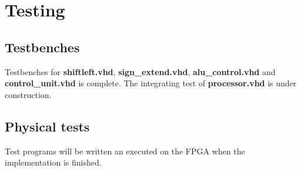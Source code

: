 \section{Testing}

\subsection{Testbenches}
Testbenches for {\bf shiftleft.vhd}, {\bf sign\_extend.vhd}, {\bf alu\_control.vhd} and {\bf control\_unit.vhd} is complete. The integrating test of {\bf processor.vhd} is under construction.

\subsection{Physical tests}
Test programs will be written an executed on the FPGA when the implementation is finished.
